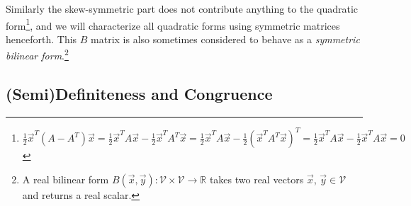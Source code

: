 Similarly the skew-symmetric part does not contribute anything to the quadratic form\footnote{$\frac{1}{2}\vec{x}^T(A - A^T)\vec{x} = \frac{1}{2}\vec{x}^TA\vec{x} - \frac{1}{2}\vec{x}^TA^T\vec{x} = \frac{1}{2}\vec{x}^TA\vec{x} - \frac{1}{2}(\vec{x}^TA^T\vec{x})^T = \frac{1}{2}\vec{x}^TA\vec{x} - \frac{1}{2}\vec{x}^TA\vec{x} = 0$}, and we will characterize all quadratic forms using symmetric matrices henceforth.
This $B$ matrix is also sometimes considered to behave as a \textit{symmetric bilinear form}.\footnote{A real bilinear form $B(\vec{x}, \vec{y}): \mathcal{V} \times \mathcal{V} \to \mathbb{R}$ takes two real vectors $\vec{x}$, $\vec{y} \in \mathcal{V}$ and returns a real scalar.}

\subsection{(Semi)Definiteness and Congruence}

